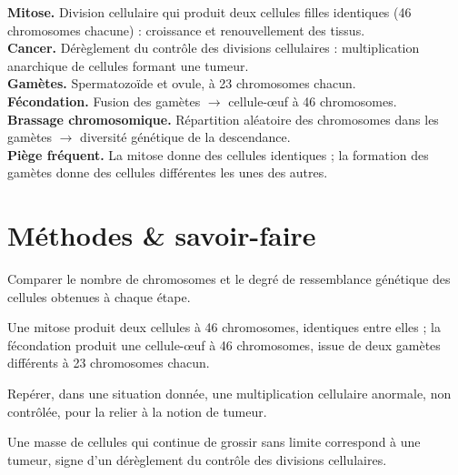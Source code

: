 \begin{synthese}
\textbf{Mitose.} Division cellulaire qui produit deux cellules filles identiques (46
chromosomes chacune) : croissance et renouvellement des tissus.\\[4pt]
\textbf{Cancer.} Dérèglement du contrôle des divisions cellulaires : multiplication
anarchique de cellules formant une tumeur.\\[4pt]
\textbf{Gamètes.} Spermatozoïde et ovule, à 23 chromosomes chacun.\\[4pt]
\textbf{Fécondation.} Fusion des gamètes $\to$ cellule-œuf à 46 chromosomes.\\[4pt]
\textbf{Brassage chromosomique.} Répartition aléatoire des chromosomes dans les
gamètes $\to$ diversité génétique de la descendance.\\[4pt]
\textbf{Piège fréquent.} La mitose donne des cellules identiques ; la formation des
gamètes donne des cellules différentes les unes des autres.
\end{synthese}

\section{Méthodes \& savoir-faire}

Comparer le nombre de chromosomes et le degré de ressemblance génétique des cellules
obtenues à chaque étape.
\begin{exemple}
Une mitose produit deux cellules à 46 chromosomes, identiques entre elles ; la
fécondation produit une cellule-œuf à 46 chromosomes, issue de deux gamètes différents
à 23 chromosomes chacun.
\end{exemple}

Repérer, dans une situation donnée, une multiplication cellulaire anormale, non
contrôlée, pour la relier à la notion de tumeur.
\begin{exemple}
Une masse de cellules qui continue de grossir sans limite correspond à une tumeur,
signe d'un dérèglement du contrôle des divisions cellulaires.
\end{exemple}

